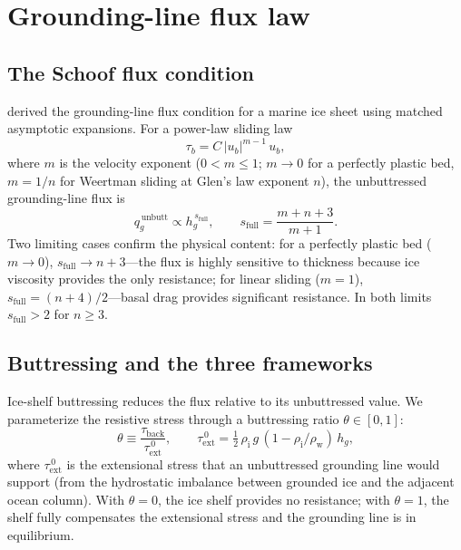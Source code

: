 \documentclass[11pt]{article}
\newcommand{\qg}{q_g}
\newcommand{\hg}{h_g}
\newcommand{\rhoi}{\rho_{\mathrm{i}}}
\newcommand{\rhow}{\rho_{\mathrm{w}}}
\begin{document}
\section{Grounding-line flux law}
\label{sec:flux_law}

\subsection{The Schoof flux condition}

\citet{Schoof2007} derived the grounding-line flux condition for a marine ice sheet using matched asymptotic expansions. For a power-law sliding law
\begin{equation}
	\tau_b = C\,|u_b|^{m-1}\,u_b,
	\label{eq:sliding_law}
\end{equation}
where $m$ is the velocity exponent ($0 < m \leq 1$; $m \to 0$ for a perfectly plastic bed, $m = 1/n$ for Weertman sliding at Glen's law exponent $n$), the unbuttressed grounding-line flux is
\begin{equation}
	\qg^{\,\mathrm{unbutt}} \propto \hg^{\,s_{\mathrm{full}}},
	\qquad
	s_{\mathrm{full}} = \frac{m + n + 3}{m + 1}.
	\label{eq:s_full}
\end{equation}
Two limiting cases confirm the physical content: for a perfectly plastic bed ($m \to 0$), $s_{\mathrm{full}} \to n + 3$---the flux is highly sensitive to thickness because ice viscosity provides the only resistance; for linear sliding ($m = 1$), $s_{\mathrm{full}} = (n+4)/2$---basal drag provides significant resistance. In both limits $s_{\mathrm{full}} > 2$ for $n \geq 3$.

\subsection{Buttressing and the three frameworks}
\label{sec:buttressing}

Ice-shelf buttressing reduces the flux relative to its unbuttressed value. We parameterize the resistive stress through a buttressing ratio $\theta \in [0,1]$:
\begin{equation}
	\theta \equiv \frac{\tau_{\mathrm{back}}}{\tau_{\mathrm{ext}}^{\,0}},
	\qquad
	\tau_{\mathrm{ext}}^{\,0} = \tfrac{1}{2}\,\rhoi\,g\,(1 - \rhoi/\rhow)\,\hg,
	\label{eq:theta_def}
\end{equation}
where $\tau_{\mathrm{ext}}^{\,0}$ is the extensional stress that an unbuttressed grounding line would support (from the hydrostatic imbalance between grounded ice and the adjacent ocean column).  With $\theta = 0$, the ice shelf provides no resistance; with $\theta = 1$, the shelf fully compensates the extensional stress and the grounding line is in equilibrium.
\end{document}
